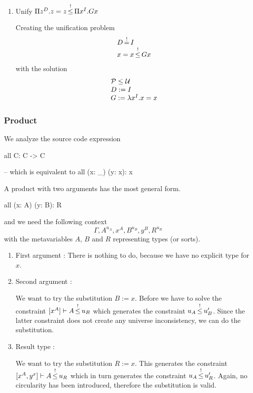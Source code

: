 \begin{enumerate}
\begin{enumerate}
    \item Unify $\Pi z^D. z = z {\,\stackrel{!}{\le}\,} \Pi x^I. G x$

    Creating the unification problem
    $$
    \begin{array}{l}
        D {\,\stackrel{!}{=}\,} I
        \\
        x = x {\,\stackrel{!}{\le}\,} G x
    \end{array}
    $$
    with the solution
    $$
    \begin{array}{l}
        {\cal{P}} \le {\cal{U}}
        \\
        D := I
        \\
        G := \lambda x^I. x = x
    \end{array}
    $$

    \end{enumerate}
\end{enumerate}


\subsubsection{Product}

We analyze the source code expression
\begin{alba}
    all C: C -> C

    -- which is equivalent to
    all (x: _) (y: x): x
\end{alba}

A product with two arguments has the most general form.
%
\begin{alba}
    all (x: A) (y: B): R
\end{alba}
%
and we need the following context
$$
\Gamma, A^{u_A}, x^A, B^{u_B}, y^B, R^{u_R}
$$
%
with the metavariables $A$, $B$ and $R$ representing types (or sorts).



\begin{enumerate}

\item First argument : There is nothing to do, because we have no
explicit type for $x$.

\item Second argument :

We want to try the substitution $B := x$. Before we have to solve the constraint
$[x^A] \vdash A {\,\stackrel{!}{\le}\,} u_B$ which generates the constraint $u_A {\,\stackrel{!}{\le}\,} u_B'$.
Since the latter constraint does not create any universe inconsistency, we can
do the substitution.

\item Result type :

We want to try the substitution $R := x$. This generates the constraint
$[x^A, y^x] \vdash A {\,\stackrel{!}{\le}\,} u_R$
which in turn generates the constraint
$u_A {\,\stackrel{!}{\le}\,} u_R'$.
%
Again, no circularity has been introduced, therefore the substitution is valid.

\end{enumerate}

